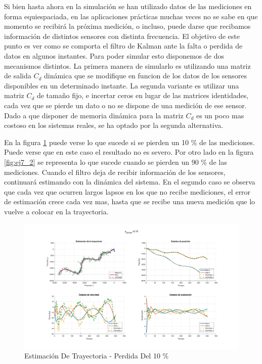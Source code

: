 
	Si bien hasta ahora en la simulación se han utilizado datos de las mediciones en forma equiespaciada, en las aplicaciones prácticas muchas veces no se sabe en que momento se recibirá la próxima medición, o incluso, puede darse que recibamos información de distintos sensores con distinta frecuencia. El objetivo de este punto es ver como se comporta el filtro de Kalman ante la falta o perdida de datos en algunos instantes. Para poder simular esto disponemos de dos mecanismos distintos. La primera manera de simularlo es utilizando una matriz de salida $C_d$ dinámica que se modifique en funcion de los datos de los sensores disponibles en un determinado instante. La segunda variante es utilizar una matriz $C_d$ de tamaño fijo, e incertar ceros en lugar de las matrices identidades, cada vez que se pierde un dato o no se dispone de una medición de ese sensor. Dado a que disponer de memoria dinámica para la matriz $C_d$ es un poco mas costoso en los sistemas reales, se ha optado por la segunda alternativa.
	
	En la figura \ref{fig:ej7_1} puede verse lo que sucede si se pierden un 10 \% de las mediciones. Puede verse que en este caso el resultado no es severo. Por otro lado en la figura \ref{fig:ej7_2} se representa lo que sucede cuando se pierden un 90 \% de las mediciones. Cuando el filtro deja de recibir información de los sensores, continuará estimando con la dinámica del sistema. En el segundo caso se observa que cada vez que ocurren largos lapsos en los que no recibe mediciones, el error de estimación crece cada vez mas, hasta que se recibe una nueva medición que lo vuelve a colocar en la trayectoria.
	
	\begin{figure}[H]
		\centering
		\includegraphics[width=1.0\textwidth,keepaspectratio]{Figuras/graf_ej7_1.pdf}
		\caption{Estimación De Trayectoria - Perdida Del 10 \%}
		\label{fig:ej7_1}
	\end{figure}
	

